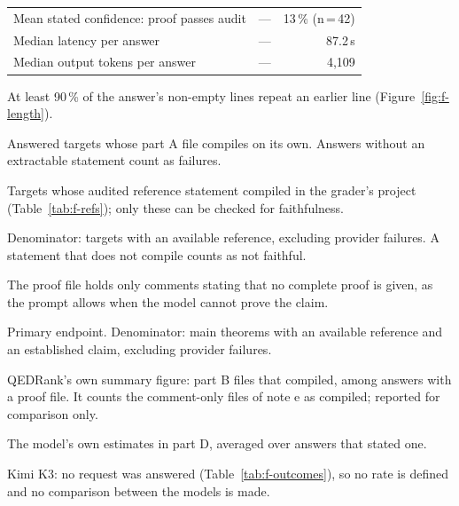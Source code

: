 \documentclass[11pt]{article}
\begin{document}
\begin{table}[!htbp]
\begin{threeparttable}
\begin{tabular}{@{}lrr@{}}
Mean stated confidence: proof passes audit\tnote{h} & --- & 13\,\% {\footnotesize(n\,=\,42)} \\
Median latency per answer & --- & 87.2\,s \\
Median output tokens per answer & --- & 4{,}109 \\
\bottomrule
\end{tabular}
\begin{tablenotes}\footnotesize
\item[a] At least 90\,\% of the answer's non-empty lines repeat an earlier line (Figure~\ref{fig:f-length}).
\item[b] Answered targets whose part A file compiles on its own. Answers without an extractable statement count as failures.
\item[c] Targets whose audited reference statement compiled in the grader's project (Table~\ref{tab:f-refs}); only these can be checked for faithfulness.
\item[d] Denominator: targets with an available reference, excluding provider failures. A statement that does not compile counts as not faithful.
\item[e] The proof file holds only comments stating that no complete proof is given, as the prompt allows when the model cannot prove the claim.
\item[f] Primary endpoint. Denominator: main theorems with an available reference and an established claim, excluding provider failures.
\item[g] QEDRank's own summary figure: part B files that compiled, among answers with a proof file. It counts the comment-only files of note e as compiled; reported for comparison only.
\item[h] The model's own estimates in part D, averaged over answers that stated one.
\item[] Kimi K3: no request was answered (Table~\ref{tab:f-outcomes}), so no rate is defined and no comparison between the models is made.
\end{tablenotes}
\end{threeparttable}
\end{table}
\end{document}
